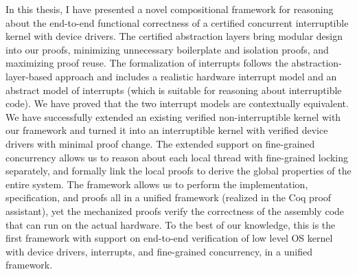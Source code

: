 \label{chapt:concl}

In this thesis, I have presented a novel compositional framework for reasoning about
the end-to-end functional correctness of a certified concurrent
interruptible kernel with device drivers. 
The certified abstraction layers bring modular design into our proofs,
minimizing unnecessary boilerplate and isolation proofs, and maximizing
proof reuse.  The formalization of interrupts follows the
abstraction-layer-based approach and includes a realistic hardware
interrupt model and an abstract model of interrupts (which is suitable
for reasoning about interruptible code). We have proved that the two
interrupt models are contextually equivalent.  We have successfully
extended an existing verified non-interruptible kernel with our
framework and turned it into an interruptible kernel with verified
device drivers with minimal proof change.
The extended support on fine-grained concurrency allows us
to reason about each local thread with fine-grained locking separately,
and formally link the local proofs to derive the global properties of
the entire system. 
The framework allows us to perform the implementation, specification, and proofs
all in a unified framework (realized in the Coq proof assistant), yet
the mechanized proofs verify the correctness of the assembly code that
can run on the actual hardware. To the best of our knowledge, this is
the first framework with support on end-to-end verification of low level OS kernel
with device drivers, interrupts, and fine-grained concurrency, in a
unified framework.

